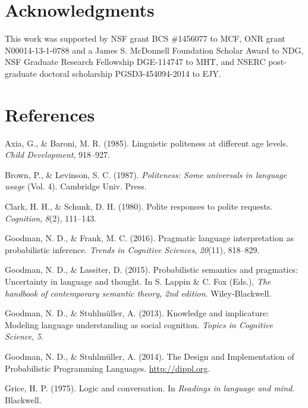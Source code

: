 \documentclass[10pt, letterpaper]{article}
\begin{document}
\section{Acknowledgments}\label{acknowledgments}

This work was supported by NSF grant BCS \#1456077 to MCF, ONR grant
N00014-13-1-0788 and a James S. McDonnell Foundation Scholar Award to
NDG, NSF Graduate Research Fellowship DGE-114747 to MHT, and NSERC
post-graduate doctoral scholarship PGSD3-454094-2014 to EJY.

\section{References}\label{references}

\setlength{\parindent}{-0.1in} \setlength{\leftskip}{0.125in} \noindent

\hypertarget{refs}{}
\hypertarget{ref-axia1985}{}
Axia, G., \& Baroni, M. R. (1985). Linguistic politeness at different
age levels. \emph{Child Development}, 918--927.

\hypertarget{ref-Brown1987}{}
Brown, P., \& Levinson, S. C. (1987). \emph{Politeness: Some universals
in language usage} (Vol. 4). Cambridge Univ. Press.

\hypertarget{ref-clark1980}{}
Clark, H. H., \& Schunk, D. H. (1980). Polite responses to polite
requests. \emph{Cognition}, \emph{8}(2), 111--143.

\hypertarget{ref-goodman2016}{}
Goodman, N. D., \& Frank, M. C. (2016). Pragmatic language
interpretation as probabilistic inference. \emph{Trends in Cognitive
Sciences}, \emph{20}(11), 818--829.

\hypertarget{ref-GoodmanLassiter2015}{}
Goodman, N. D., \& Lassiter, D. (2015). Probabilistic semantics and
pragmatics: Uncertainty in language and thought. In S. Lappin \& C. Fox
(Eds.), \emph{The handbook of contemporary semantic theory, 2nd
edition}. Wiley-Blackwell.

\hypertarget{ref-Goodman2013}{}
Goodman, N. D., \& Stuhlmüller, A. (2013). Knowledge and implicature:
Modeling language understanding as social cognition. \emph{Topics in
Cognitive Science}, \emph{5}.

\hypertarget{ref-dippl}{}
Goodman, N. D., \& Stuhlmüller, A. (2014). The Design and Implementation
of Probabilistic Programming Languages. \url{http://dippl.org}.

\hypertarget{ref-Grice1975}{}
Grice, H. P. (1975). Logic and conversation. In \emph{Readings in
language and mind}. Blackwell.
\end{document}
